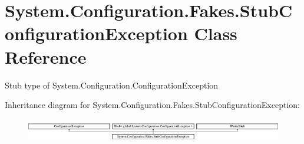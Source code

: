 \hypertarget{class_system_1_1_configuration_1_1_fakes_1_1_stub_configuration_exception}{\section{System.\-Configuration.\-Fakes.\-Stub\-Configuration\-Exception Class Reference}
\label{class_system_1_1_configuration_1_1_fakes_1_1_stub_configuration_exception}
}


Stub type of System.\-Configuration.\-Configuration\-Exception 


Inheritance diagram for System.\-Configuration.\-Fakes.\-Stub\-Configuration\-Exception\-:\begin{figure}[H]
\begin{center}
\leavevmode
\includegraphics[height=1.022831cm]{class_system_1_1_configuration_1_1_fakes_1_1_stub_configuration_exception}
\end{center}
\end{figure}
